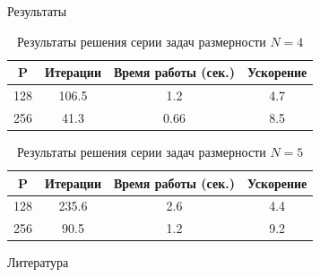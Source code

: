 \documentclass{beamer}
\begin{document}
\begin{frame}[t]
\begin{columns}[t]
\begin{column}[t]{0.47\paperwidth}
\begin{block}{Результаты}

\begin{table}[!hbp]
    \centering
    \caption{Результаты решения серии задач размерности $N=4$}
     \renewcommand{\arraystretch}{1.4}
    \renewcommand{\tabcolsep}{1cm}
    \begin{tabular}{|c|c|c|c|}
    \hline
    P  & Итерации  & Время работы (сек.) & Ускорение \\ \hline
	128 & 106.5 & 1.2  & 4.7    \\ \hline
	256 & 41.3 & 0.66   & 8.5          \\ \hline
	\end{tabular}
    
    \label{table:GKLS_RES_1}
\end{table}

\begin{table}[!hbp]
    \centering
    \caption{Результаты решения серии задач размерности $N=5$}
    \renewcommand{\arraystretch}{1.4}
    \renewcommand{\tabcolsep}{1cm}
    \begin{tabular}{|c|c|c|c|}
    \hline
    P  & Итерации  & Время работы (сек.) & Ускорение \\ \hline
	128 &        235.6 & 2.6  & 4.4      \\ \hline
	256 &       90.5  & 1.2 & 9.2      \\ \hline
	\end{tabular}
    
    \label{table:GKLS_RES_2}
\end{table}

\end{block}
          \begin{block}{Литература}
            \printbibliography
            
          \end{block}
        \end{column}
    \end{columns}
\end{frame}
\end{document}
